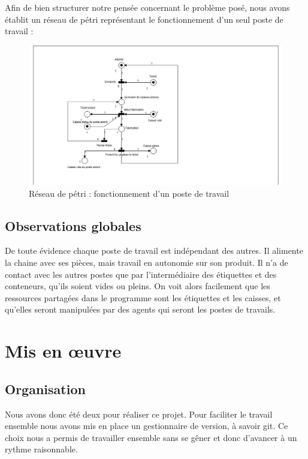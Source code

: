 \documentclass[11pt]{report}
\begin{document}
	Afin de bien structurer notre pensée concernant le problème posé, nous avons établit un réseau de pétri représentant le fonctionnement d'un seul poste de travail :
	
	\begin{figure}[!h]
\centering
\includegraphics[width=16cm]{reseau.jpg}
\caption{Réseau de pétri : fonctionnement d'un poste de travail}
\end{figure}
	
	\section{Observations globales}
		De toute évidence chaque poste de travail est indépendant des autres. Il alimente la chaine avec ses pièces, mais travail en autonomie sur son produit. Il n'a de contact avec les autres postes que par l'intermédiaire des étiquettes et des conteneurs, qu'ils soient vides ou pleins. On voit alors facilement que les ressources partagées dans le programme sont les étiquettes et les caisses, et qu'elles seront manipulées par des agents qui seront les postes de travails. 
	
		
\chapter{Mis en \oe{}uvre}

	\section{Organisation}
	Nous avons donc été deux pour réaliser ce projet. Pour faciliter le travail ensemble nous avons mis en place un gestionnaire de version, à savoir git. Ce choix nous a permis de travailler ensemble sans se gêner et donc d'avancer à un rythme raisonnable. 
	
\end{document}
